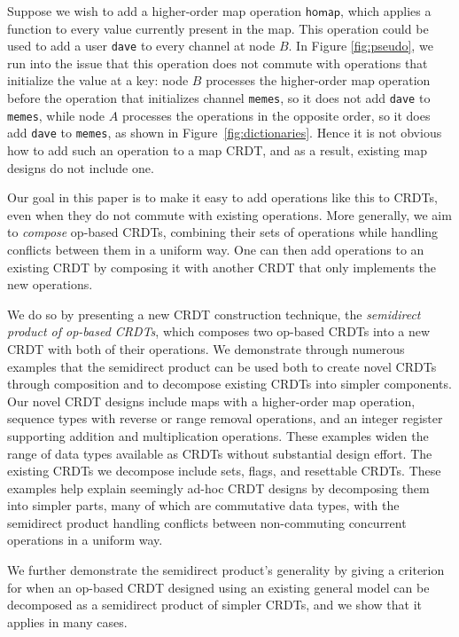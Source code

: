 \documentclass[acmsmall,nonacm,12pt]{acmart}
\newcommand{\msf}[1]{\ensuremath{\mathsf{#1}}}
\theoremstyle{plain}
\theoremstyle{definition}
\begin{document}
Suppose we wish to add a higher-order map operation $\msf{homap}$, which applies a function to every value currently present in the map. This operation could be used to add a user \texttt{dave} to every channel at node $B$.  In Figure \ref{fig:pseudo}, we run into the issue that this operation does not commute with operations that initialize the value at a key: node $B$ processes the higher-order map operation before the operation that initializes channel \texttt{memes}, so it does not add \texttt{dave} to \texttt{memes}, while node $A$ processes the operations in the opposite order, so it does add \texttt{dave} to \texttt{memes}, as shown in Figure~\ref{fig:dictionaries}.   Hence it is not obvious how to add such an operation to a map CRDT, and as a result, existing map designs do not include one.

Our goal in this paper is to make it easy to add operations like this to CRDTs, even when they do not commute with existing operations.  More generally, we aim to \textit{compose} op-based CRDTs, combining their sets of operations while handling conflicts between them in a uniform way.  One can then add operations to an existing CRDT by composing it with another CRDT that only implements the new operations.

We do so by presenting a new CRDT construction technique, the \textit{semidirect product of op-based CRDTs}, which composes two op-based CRDTs into a new CRDT with both of their operations.  We demonstrate through numerous examples that the semidirect product can be used both to create novel CRDTs through composition and to decompose existing CRDTs into simpler components.  Our novel CRDT designs include maps with a higher-order map operation, sequence types with reverse or range removal operations, and an integer register supporting addition and multiplication operations.  These examples widen the range of data types available as CRDTs without substantial design effort.  The existing CRDTs we decompose include sets, flags, and resettable CRDTs.  These examples help explain seemingly ad-hoc CRDT designs by decomposing them into simpler parts, many of which are commutative data types, with the semidirect product handling conflicts between non-commuting concurrent operations in a uniform way.

We further demonstrate the semidirect product's generality by giving a criterion for when an op-based CRDT designed using an existing general model \cite{pure_op_based_crdts_extended} can be decomposed as a semidirect product of simpler CRDTs, and we show that it applies in many cases.
\end{document}
